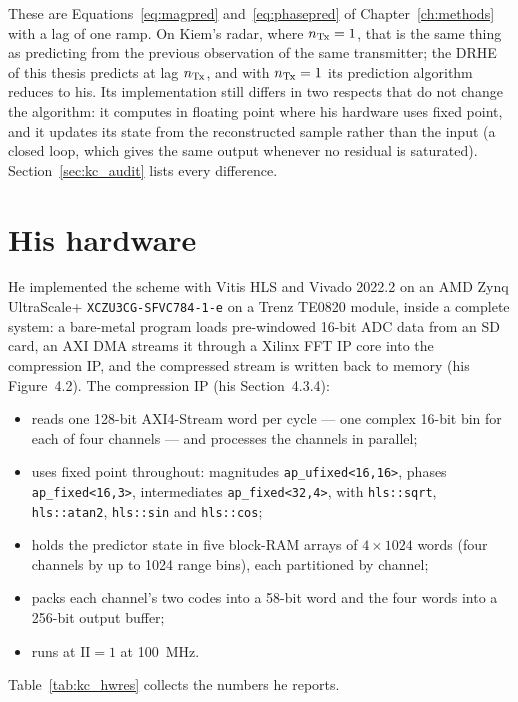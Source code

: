 These are Equations~\eqref{eq:magpred} and~\eqref{eq:phasepred} of
Chapter~\ref{ch:methods} with a lag of one ramp. On Kiem's radar, where
$n_{\mathrm{Tx}} = 1$, that is the same thing as predicting from the previous observation
of the same transmitter; the DRHE of this thesis predicts at lag $n_{\mathrm{Tx}}$, and
with $n_{\mathrm{Tx}} = 1$ its prediction algorithm reduces to his. Its implementation
still differs in two respects that do not change the algorithm: it computes in
floating point where his hardware uses fixed point, and it updates its state
from the reconstructed sample rather than the input (a closed loop, which gives
the same output whenever no residual is saturated). Section~\ref{sec:kc_audit}
lists every difference.

\section{His hardware}
\label{sec:kc_hw}

He implemented the scheme with Vitis HLS and Vivado 2022.2 on an AMD Zynq
UltraScale+ \texttt{XCZU3CG-SFVC784-1-e} on a Trenz TE0820 module, inside a
complete system: a bare-metal program loads pre-windowed 16-bit ADC data from
an SD card, an AXI DMA streams it through a Xilinx FFT IP core into the
compression IP, and the compressed stream is written back to memory
(his Figure~4.2). The compression IP (his Section~4.3.4):

\begin{itemize}
\item reads one 128-bit AXI4-Stream word per cycle --- one complex 16-bit bin
for each of four channels --- and processes the channels in parallel;
\item uses fixed point throughout: magnitudes \texttt{ap\_ufixed<16,16>},
phases \texttt{ap\_fixed<16,3>}, intermediates \texttt{ap\_fixed<32,4>}, with
\texttt{hls::sqrt}, \texttt{hls::atan2}, \texttt{hls::sin} and
\texttt{hls::cos};
\item holds the predictor state in five block-RAM arrays of $4 \times 1024$
words (four channels by up to 1024 range bins), each partitioned by channel;
\item packs each channel's two codes into a 58-bit word and the four words into
a 256-bit output buffer;
\item runs at $\mathrm{II} = 1$ at \SI{100}{\mega\hertz}.
\end{itemize}

\noindent
Table~\ref{tab:kc_hwres} collects the numbers he reports.

